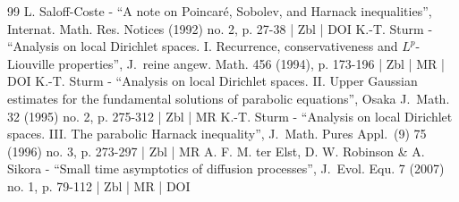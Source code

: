\documentclass[10pt]{amsart}
\theoremstyle{plain}
\theoremstyle{definition}
\begin{document}
\begin{thebibliography}{99}
L. Saloff-Coste - “A note on Poincaré, Sobolev, and Harnack inequalities”, Internat. Math. Res. Notices (1992) no. 2, p. 27-38 | Zbl | DOI
K.-T. Sturm - “Analysis on local Dirichlet spaces. I. Recurrence, conservativeness and $L^p$-Liouville properties”, J. reine angew. Math. 456 (1994), p. 173-196 | Zbl | MR | DOI
K.-T. Sturm - “Analysis on local Dirichlet spaces. II. Upper Gaussian estimates for the fundamental solutions of parabolic equations”, Osaka J. Math. 32 (1995) no. 2, p. 275-312 | Zbl | MR
K.-T. Sturm - “Analysis on local Dirichlet spaces. III. The parabolic Harnack inequality”, J. Math. Pures Appl. (9) 75 (1996) no. 3, p. 273-297 | Zbl | MR
A. F. M. ter Elst, D. W. Robinson \& A. Sikora - “Small time asymptotics of diffusion processes”, J. Evol. Equ. 7 (2007) no. 1, p. 79-112 | Zbl | MR | DOI
\end{thebibliography}
\end{document}
